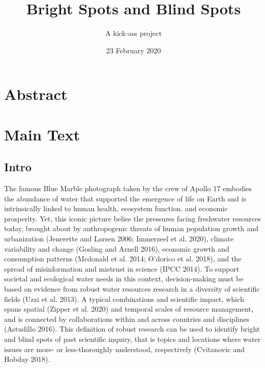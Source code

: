 \documentclass[]{article}
\title{Bright Spots and Blind Spots}
\subtitle{A kick-ass project}
\author{}
\date{23 February 2020}
\begin{document}
\maketitle

\hypertarget{abstract}{%
\section{Abstract}\label{abstract}}

\hypertarget{main-text}{%
\section{Main Text}\label{main-text}}

\hypertarget{intro}{%
\subsection{Intro}\label{intro}}

The famous Blue Marble photograph taken by the crew of Apollo 17
embodies the abundance of water that supported the emergence of life on
Earth and is intrinsically linked to human health, ecosystem function,
and economic prosperity. Yet, this iconic picture belies the pressures
facing freshwater resources today, brought about by anthropogenic
threats of human population growth and urbanization (Jenerette and
Larsen 2006; Immerzeel et al. 2020), climate variability and change
(Gosling and Arnell 2016), economic growth and consumption patterns
(Mcdonald et al. 2014; O'dorico et al. 2018), and the spread of
misinformation and mistrust in science (IPCC 2014). To support societal
and ecological water needs in this context, decision-making must be
based on evidence from robust water resources research in a diversity of
scientific fields (Uzzi et al. 2013). A typical combinations and
scientific impact, which spans spatial (Zipper et al. 2020) and temporal
scales of resource management, and is connected by collaborations within
and across countries and disciplines (Astudillo 2016). This definition
of robust research can be used to identify bright and blind spots of
past scientific inquiry, that is topics and locations where water issues
are more- or less-thoroughly understood, respectively (Cvitanovic and
Hobday 2018).
\end{document}
